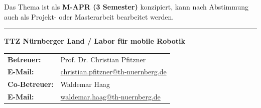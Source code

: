 \documentclass{ohm_project_description}
\begin{document}
\vspace{0.5cm}
Das Thema ist als \textbf{M-APR (3 Semester)} konzipiert, kann nach Abstimmung auch als Projekt- oder Masterarbeit bearbeitet werden.

\vfill
\textcolor{ohm_red}{\rule{\linewidth}{0.4mm}}
\textbf{\textcolor{ohm_red}{TTZ Nürnberger Land / Labor für mobile Robotik}} \\
\begin{tabular}{@{}ll}
\textbf{Betreuer:}   & Prof. Dr. Christian Pfitzner \\
\textbf{E-Mail:}     & \href{mailto:christian.pfitzner@th-nuernberg.de}{christian.pfitzner@th-nuernberg.de} \\
\textbf{Co-Betreuer:} & Waldemar Haag \\
\textbf{E-Mail:}     & \href{mailto:waldemar.haag@th-nuernberg.de}{waldemar.haag@th-nuernberg.de} \\
\end{tabular}
\end{document}
